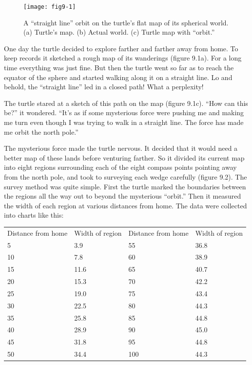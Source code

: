 \documentclass{book}
\begin{document}
\begin{figure}
\begin{center}
\texttt{[image: fig9-1]}
\caption{A ``straight line'' orbit on the turtle's flat map of its spherical world. (a) Turtle's map. (b) Actual world. (c) Turtle map with ``orbit.''}
\end{center}
\end{figure}

One day the turtle decided to explore farther and farther away from
home. To keep records it sketched a rough map of its wanderings (figure
9.1a). For a long time everything was just fine. But then the turtle went
so far as to reach the equator of the sphere and started walking along
it on a straight line. Lo and behold, the ``straight line'' led in a closed
path! What a perplexity!

The turtle stared at a sketch of this path on the map (figure 9.1c).
``How can this be?'' it wondered. ``It's as if some mysterious force were pushing me and making me turn even though I was trying to walk in a straight line. The force has made me orbit the north pole.''

The mysterious force made the turtle nervous. It decided that it would
need a better map of these lands before venturing farther. So it divided
its current map into eight regions surrounding each of the eight compass
points pointing away from the north pole, and took to surveying each
wedge carefully (figure 9.2). The survey method was quite simple. First
the turtle marked the boundaries between the regions all the way out
to beyond the mysterious ``orbit.'' Then it measured the width of each
region at various distances from home. The data were collected into
charts like this:

\vspace{0.5cm}

\begin{tabular}{l l l l}
Distance from home & Width of region & Distance from home & Width of region \\
5 & 3.9 & 55 & 36.8 \\
10 & 7.8 & 60 & 38.9 \\
15 & 11.6 & 65 & 40.7 \\
20 & 15.3 & 70 & 42.2 \\
25 & 19.0 & 75 & 43.4 \\
30 & 22.5 & 80 & 44.3 \\
35 & 25.8 & 85 & 44.8 \\
40 & 28.9 & 90 & 45.0 \\
45 & 31.8 & 95 & 44.8 \\
50 & 34.4 & 100 & 44.3 \\
\end{tabular}
\end{document}
